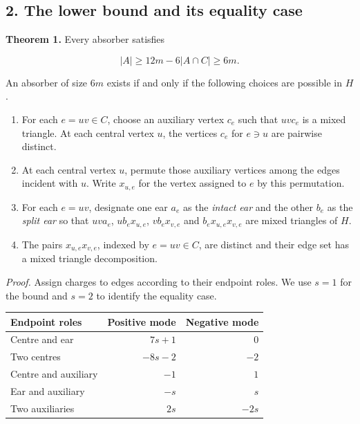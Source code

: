 \documentclass[english,11pt,a4paper]{article}
\providecommand{\tightlist}{\setlength{\itemsep}{0pt}\setlength{\parskip}{0pt}}
\newcounter{none}
\begin{document}
\clearpage\subsection{2. The lower bound and its equality case}\label{the-lower-bound-and-its-equality-case}

\textbf{Theorem 1.} Every absorber satisfies

\[
|A|\ge 12m-6|A\cap C|\ge 6m.
\]

An absorber of size \(6m\) exists if and only if the following choices are possible in \(H\).

\begin{enumerate}
\def\labelenumi{\arabic{enumi}.}
\tightlist
\item
  For each \(e=uv\in C\), choose an auxiliary vertex \(c_e\) such that \(uvc_e\) is a mixed triangle. At each central vertex \(u\), the vertices \(c_e\) for \(e\ni u\) are pairwise distinct.
\item
  At each central vertex \(u\), permute those auxiliary vertices among the edges incident with \(u\). Write \(x_{u,e}\) for the vertex assigned to \(e\) by this permutation.
\item
  For each \(e=uv\), designate one ear \(a_e\) as the \emph{intact ear} and the other \(b_e\) as the \emph{split ear} so that \(uva_e\), \(ub_ex_{u,e}\), \(vb_ex_{v,e}\) and \(b_ex_{u,e}x_{v,e}\) are mixed triangles of \(H\).
\item
  The pairs \(x_{u,e}x_{v,e}\), indexed by \(e=uv\in C\), are distinct and their edge set has a mixed triangle decomposition.
\end{enumerate}

\emph{Proof.} Assign charges to edges according to their endpoint roles. We use \(s=1\) for the bound and \(s=2\) to identify the equality case.

{\def\LTcaptype{none} %
\begin{longtable}[]{@{}lrr@{}}
\toprule\noalign{}
Endpoint roles & Positive mode & Negative mode \\
\midrule\noalign{}
\endhead
\bottomrule\noalign{}
\endlastfoot
Centre and ear & \(7s+1\) & \(0\) \\
Two centres & \(-8s-2\) & \(-2\) \\
Centre and auxiliary & \(-1\) & \(1\) \\
Ear and auxiliary & \(-s\) & \(s\) \\
Two auxiliaries & \(2s\) & \(-2s\) \\
\end{longtable}
}
\end{document}
